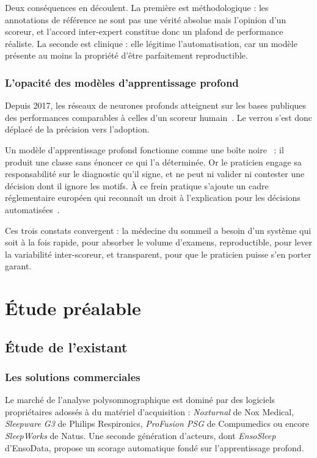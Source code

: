 Deux conséquences en découlent. La première est méthodologique : les annotations de
référence ne sont pas une vérité absolue mais l'opinion d'un scoreur, et l'accord
inter-expert constitue donc un plafond de performance réaliste. La seconde est
clinique : elle légitime l'automatisation, car un modèle présente au moins la propriété
d'être parfaitement reproductible.

\subsubsection{L'opacité des modèles d'apprentissage profond}

Depuis 2017, les réseaux de neurones profonds atteignent sur les bases publiques des
performances comparables à celles d'un scoreur humain~\cite{supratak2017,perslev2021}.
Le verrou s'est donc déplacé de la précision vers l'adoption.

Un modèle d'apprentissage profond fonctionne comme une boîte noire~\cite{adadi2018} : il
produit une
classe sans énoncer ce qui l'a déterminée. Or le praticien engage sa responsabilité sur
le diagnostic qu'il signe, et ne peut ni valider ni contester une décision dont il
ignore les motifs. À ce frein pratique s'ajoute un cadre réglementaire européen qui
reconnaît un droit à l'explication pour les décisions automatisées~\cite{goodman2017}.

\medskip
\noindent
Ces trois constats convergent : la médecine du sommeil a besoin d'un système qui soit à
la fois rapide, pour absorber le volume d'examens, reproductible,
pour lever la variabilité inter-scoreur, et transparent, pour que le praticien
puisse s'en porter garant.

\section{Étude préalable}

\subsection{Étude de l'existant}

\subsubsection{Les solutions commerciales}

Le marché de l'analyse polysomnographique est dominé par des logiciels propriétaires
adossés à du matériel d'acquisition : \emph{Noxturnal} de Nox Medical, \emph{Sleepware
G3} de Philips Respironics, \emph{ProFusion PSG} de Compumedics ou encore
\emph{SleepWorks} de Natus. Une seconde génération d'acteurs, dont \emph{EnsoSleep}
d'EnsoData, propose un scorage automatique fondé sur l'apprentissage profond.

